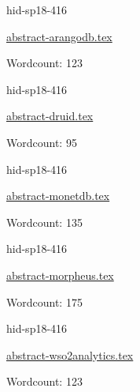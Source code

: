 

\begin{IU}

hid-sp18-416

\href{https://github.com/cloudmesh-community/hid-sp18-416/blob/master//technology/abstract-arangodb.tex}{abstract-arangodb.tex}

 

Wordcount: 123

\end{IU}



\begin{IU}

hid-sp18-416

\href{https://github.com/cloudmesh-community/hid-sp18-416/blob/master//technology/abstract-druid.tex}{abstract-druid.tex}

 

Wordcount: 95

\end{IU}



\begin{IU}

hid-sp18-416

\href{https://github.com/cloudmesh-community/hid-sp18-416/blob/master//technology/abstract-monetdb.tex}{abstract-monetdb.tex}

 

Wordcount: 135

\end{IU}



\begin{IU}

hid-sp18-416

\href{https://github.com/cloudmesh-community/hid-sp18-416/blob/master//technology/abstract-morpheus.tex}{abstract-morpheus.tex}

 

Wordcount: 175

\end{IU}



\begin{IU}

hid-sp18-416

\href{https://github.com/cloudmesh-community/hid-sp18-416/blob/master//technology/abstract-wso2analytics.tex}{abstract-wso2analytics.tex}

 

Wordcount: 123

\end{IU}

